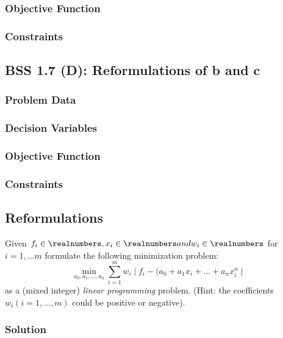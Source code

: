 \documentclass[12pt]{article}
\begin{document}
\subsubsection{Objective Function}

\subsubsection{Constraints}

\subsection{BSS 1.7 (D): Reformulations of b and c}
\subsubsection{Problem Data}

\subsubsection{Decision Variables}

\subsubsection{Objective Function}

\subsubsection{Constraints}


\subsection{Reformulations}
Given  \( f_i \in \realnumbers, x_i \in \realnumbers and w_i \in \realnumbers \) for \( i = 1,...m \) formulate the following minimization problem:\\
\begin{equation*}
    \min_{a_0,a_1,...,a_n} \sum_{i=1}^{m} w_i \mid f_i -  (a_0 + a_1 x_i + ... + a_nx_i^n \mid
\end{equation*}
as a (mixed integer) \textit{linear programming} problem. (Hint: the coefficients \( w_i (i = 1,...,m) \) could be positive or negative).

\subsubsection{Solution}
\end{document}
